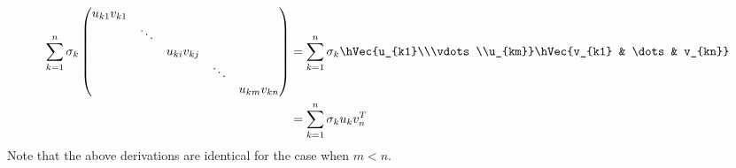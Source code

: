 \begin{equation}
\begin{split}
\sum_{k=1}^{n} \sigma_k
\begin{pmatrix}
u_{k1}v_{k1} & & & & \\
& \ddots& & & \\
& & u_{ki}v_{kj} & & \\
& & & \ddots& \\
& & & & u_{km}v_{kn}\\
\end{pmatrix}&=
\sum_{k=1}^{n} \sigma_k\hVec{u_{k1}\\\vdots\\u_{km}}\hVec{v_{k1} & \dots & v_{kn}}\\
&= \sum_{k=1}^{n}\sigma_k u_k v_n^T
\end{split}
\end{equation}
Note that the above derivations are identical for the case when $m < n$.
